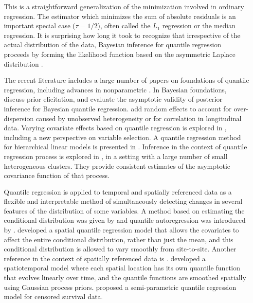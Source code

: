 \documentclass[12pt,a4paper]{article}\usepackage[]{graphicx}\usepackage[]{color}\usepackage{subfigure}
\begin{document}
This is a straightforward generalization of the minimization involved in ordinary regression.
The estimator which minimizes the sum of absolute residuals is an important special case ($\tau=1/2$), often called the $L_1$ regression or the median regression.
It is surprising how long it took to recognize that irrespective of the actual distribution of the data, Bayesian inference for quantile regression proceeds by forming the likelihood function based on the asymmetric Laplace distribution \cite{yu2001bayesian}.
 
The recent literature includes a large number of papers on foundations of quantile regression, 
including advances in nonparametric 
\cite{ gannoun2003nonparametric, cai2009nonparametric, thompson2010bayesian, kim2012semiparametric}. 
In Bayesian foundations, 
\cite{alhamzawi2012prior} discuss prior elicitation, and \cite{yang2015posterior} evaluate the asymptotic validity of posterior inference for Bayesian quantile regression. 
\cite{yue2011bayesian} add random effects to account for over-dispersion caused by unobserved heterogeneity or for correlation in longitudinal data. 
Varying covariate effects based on quantile regression is explored in \cite{peng2014shrinkage}, including a new perspective on variable selection. 
A quantile regression method for hierarchical linear models is presented in \cite{yu2015bayesian}.  
Inference in the context of quantile regression process is explored  in  \cite{hagemann2017cluster},  in a setting with a large number of  small heterogeneous clusters. 
They provide consistent estimates of the asymptotic covariance function of that process.
 
 
Quantile regression is applied to temporal and  spatially referenced data as a flexible and interpretable method of simultaneously detecting changes in several features of the distribution of some variables.
A method based on estimating the conditional distribution was given by \cite{cai2002regression} and quantile autoregression was introduced by \cite{koenker2006quantile}. 
\cite{reich2012bayesian}  developed a spatial quantile regression model that  allows the covariates to affect the entire conditional distribution, rather than just the mean, and this conditional distribution is allowed to vary smoothly from site-to-site. 
Another reference in the context of spatially referenced data is \cite{lum2012spatial}.
\cite{reich2012spatiotemporal} developed a spatiotemporal model where each spatial location has its own quantile function that evolves linearly over time, and the quantile functions are smoothed spatially using Gaussian process priors.
\cite{reich2013bayesian} proposed a semi-parametric quantile regression model for censored survival data.
\end{document}
